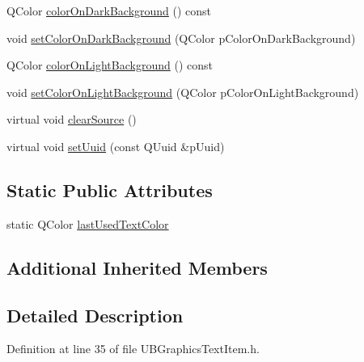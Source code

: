\begin{DoxyCompactItemize}
\item 
Q\-Color \hyperlink{class_u_b_graphics_text_item_a0100a958a115bfd4e7d3bdada9c36a55}{color\-On\-Dark\-Background} () const 
\item 
void \hyperlink{class_u_b_graphics_text_item_af5bcc4a16e675e7d16c0f89a0ef4c4c9}{set\-Color\-On\-Dark\-Background} (Q\-Color p\-Color\-On\-Dark\-Background)
\item 
Q\-Color \hyperlink{class_u_b_graphics_text_item_a5cb65bca875b7654dcfd13418c294cc1}{color\-On\-Light\-Background} () const 
\item 
void \hyperlink{class_u_b_graphics_text_item_a4970260af3b1ef583763441a4cd8b30a}{set\-Color\-On\-Light\-Background} (Q\-Color p\-Color\-On\-Light\-Background)
\item 
virtual void \hyperlink{class_u_b_graphics_text_item_af02cdd515452229135ca5ee9e0a944ba}{clear\-Source} ()
\item 
virtual void \hyperlink{class_u_b_graphics_text_item_a91ebcd957d46156859eeb3e9047194bc}{set\-Uuid} (const Q\-Uuid \&p\-Uuid)
\end{DoxyCompactItemize}
\subsection*{Static Public Attributes}
\begin{DoxyCompactItemize}
\item 
static Q\-Color \hyperlink{class_u_b_graphics_text_item_a2ef8e51d1f91fc24d65445826fd8b83e}{last\-Used\-Text\-Color}
\end{DoxyCompactItemize}
\subsection*{Additional Inherited Members}


\subsection{Detailed Description}


Definition at line 35 of file U\-B\-Graphics\-Text\-Item.\-h.



